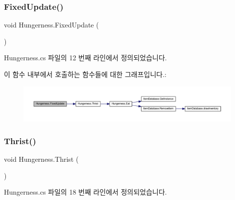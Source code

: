 \subsubsection{\texorpdfstring{FixedUpdate()}{FixedUpdate()}}
{\footnotesize\ttfamily void Hungerness.\+Fixed\+Update (\begin{DoxyParamCaption}{ }\end{DoxyParamCaption})\hspace{0.3cm}{\ttfamily [private]}}



Hungerness.\+cs 파일의 12 번째 라인에서 정의되었습니다.


\begin{DoxyCode}{0}

\end{DoxyCode}
이 함수 내부에서 호출하는 함수들에 대한 그래프입니다.\+:\nopagebreak
\begin{figure}[H]
\begin{center}
\leavevmode
\includegraphics[width=350pt]{db/d74/class_hungerness_a0d5665654ffa0599fa8d6eb9d86d4963_cgraph}
\end{center}
\end{figure}
\mbox{\label{class_hungerness_a3c2776ba20e8a72e763ad02ded86aad9}} 
\subsubsection{\texorpdfstring{Thrist()}{Thrist()}}
{\footnotesize\ttfamily void Hungerness.\+Thrist (\begin{DoxyParamCaption}{ }\end{DoxyParamCaption})}



Hungerness.\+cs 파일의 18 번째 라인에서 정의되었습니다.


